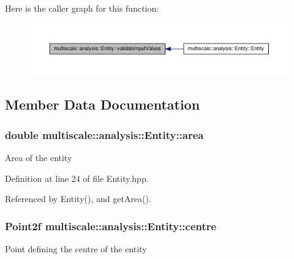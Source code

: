 \-Here is the caller graph for this function\-:
\nopagebreak
\begin{figure}[H]
\begin{center}
\leavevmode
\includegraphics[width=350pt]{classmultiscale_1_1analysis_1_1Entity_afd09bf78874eb411c0940713948c4891_icgraph}
\end{center}
\end{figure}




\subsection{\-Member \-Data \-Documentation}
\hypertarget{classmultiscale_1_1analysis_1_1Entity_a7fad3c67bb46cc0f4ce1fb17ef3e66cc}{
\subsubsection[{area}]{\setlength{\rightskip}{0pt plus 5cm}double {\bf multiscale\-::analysis\-::\-Entity\-::area}}}\label{classmultiscale_1_1analysis_1_1Entity_a7fad3c67bb46cc0f4ce1fb17ef3e66cc}
\-Area of the entity 

\-Definition at line 24 of file \-Entity.\-hpp.



\-Referenced by \-Entity(), and get\-Area().

\hypertarget{classmultiscale_1_1analysis_1_1Entity_ad226609174b21f71210161d29a16d4ef}{
\subsubsection[{centre}]{\setlength{\rightskip}{0pt plus 5cm}\-Point2f {\bf multiscale\-::analysis\-::\-Entity\-::centre}}}\label{classmultiscale_1_1analysis_1_1Entity_ad226609174b21f71210161d29a16d4ef}
\-Point defining the centre of the entity 

